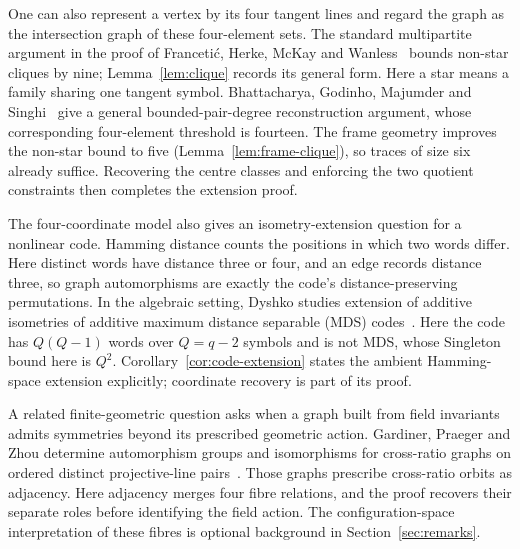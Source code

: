 \documentclass[11pt]{article}
\theoremstyle{definition}
\theoremstyle{remark}
\begin{document}
One can also represent a vertex by its four tangent lines and regard the
graph as the intersection graph of these four-element sets. The standard
multipartite argument in the proof of Franceti\'c, Herke, McKay and
Wanless~\cite[Lemma 2.2]{FHMW} bounds non-star cliques by nine;
Lemma~\ref{lem:clique} records its general form. Here a star means a
family sharing one tangent symbol. Bhattacharya, Godinho, Majumder and
Singhi~\cite[Lemmas 2.3--2.4]{BGMS} give a general bounded-pair-degree
reconstruction argument, whose corresponding four-element threshold is
fourteen. The frame geometry improves the non-star bound to five
(Lemma~\ref{lem:frame-clique}), so traces of size six already suffice.
Recovering the centre classes and enforcing the two quotient constraints
then completes the extension proof.

The four-coordinate model also gives an isometry-extension question for
a nonlinear code. Hamming distance counts the positions in which two
words differ. Here distinct words have distance three or four, and an
edge records distance three, so graph automorphisms are exactly the
code's distance-preserving permutations. In the algebraic setting,
Dyshko studies extension of additive isometries of additive maximum
distance separable (MDS) codes~\cite[Sections 1--2]{Dyshko}. Here the
code has $Q(Q-1)$ words over $Q=q-2$ symbols and is not MDS, whose
Singleton bound here is $Q^2$. Corollary~\ref{cor:code-extension} states
the ambient Hamming-space extension explicitly; coordinate recovery is
part of its proof.

A related finite-geometric question asks when a graph built from field
invariants admits symmetries beyond its prescribed geometric action.
Gardiner, Praeger and Zhou determine automorphism groups and isomorphisms
for cross-ratio graphs on ordered distinct projective-line
pairs~\cite[Theorems 7.1--7.2]{GPZ}. Those graphs prescribe cross-ratio
orbits as adjacency. Here adjacency merges four fibre relations, and the
proof recovers their separate roles before identifying the field action.
The configuration-space interpretation of these fibres is optional
background in Section~\ref{sec:remarks}.
\end{document}
